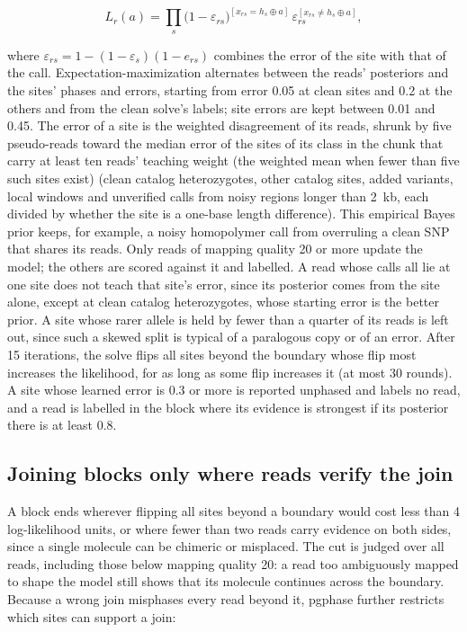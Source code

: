\begin{equation}
L_r(a) = \prod_{s} \bigl(1-\varepsilon_{rs}\bigr)^{[x_{rs} = h_s \oplus a]}\, \varepsilon_{rs}^{[x_{rs} \neq h_s \oplus a]},
\end{equation}

where \(\varepsilon_{rs} = 1-(1-\varepsilon_s)(1-e_{rs})\) combines the error of the site with that of the call. Expectation-maximization \citep{Dempster1977} alternates between the reads' posteriors and the sites' phases and errors, starting from error 0.05 at clean sites and 0.2 at the others and from the clean solve's labels; site errors are kept between 0.01 and 0.45. The error of a site is the weighted disagreement of its reads, shrunk by five pseudo-reads toward the median error of the sites of its class in the chunk that carry at least ten reads' teaching weight (the weighted mean when fewer than five such sites exist) (clean catalog heterozygotes, other catalog sites, added variants, local windows and unverified calls from noisy regions longer than 2~kb, each divided by whether the site is a one-base length difference). This empirical Bayes prior keeps, for example, a noisy homopolymer call from overruling a clean SNP that shares its reads. Only reads of mapping quality 20 or more update the model; the others are scored against it and labelled. A read whose calls all lie at one site does not teach that site's error, since its posterior comes from the site alone, except at clean catalog heterozygotes, whose starting error is the better prior. A site whose rarer allele is held by fewer than a quarter of its reads is left out, since such a skewed split is typical of a paralogous copy or of an error. After 15 iterations, the solve flips all sites beyond the boundary whose flip most increases the likelihood, for as long as some flip increases it (at most 30 rounds). A site whose learned error is 0.3 or more is reported unphased and labels no read, and a read is labelled in the block where its evidence is strongest if its posterior there is at least 0.8.

\subsection{Joining blocks only where reads verify the join}

A block ends wherever flipping all sites beyond a boundary would cost less than 4 log-likelihood units, or where fewer than two reads carry evidence on both sides, since a single molecule can be chimeric or misplaced. The cut is judged over all reads, including those below mapping quality 20: a read too ambiguously mapped to shape the model still shows that its molecule continues across the boundary. Because a wrong join misphases every read beyond it, pgphase further restricts which sites can support a join:

